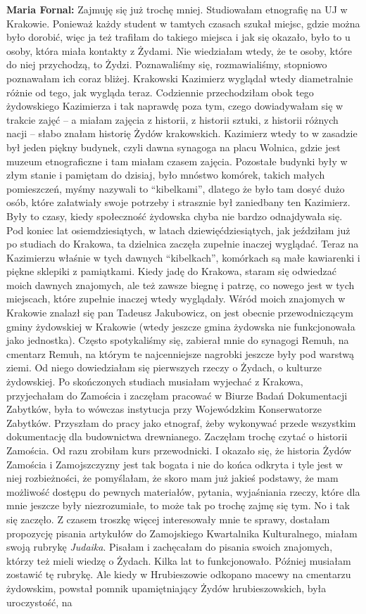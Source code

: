 \begin{otherlanguage}{polish}
\textbf{Maria Fornal:} Zajmuję się już trochę mniej. Studiowałam etnografię na UJ w Krakowie. Ponieważ każdy student w tamtych czasach szukał miejsc, gdzie można było dorobić, więc ja też trafiłam do takiego miejsca i jak się okazało, było to u osoby, która miała kontakty z Żydami. Nie wiedziałam wtedy, że te osoby, które do niej przychodzą, to Żydzi. Poznawaliśmy się, rozmawialiśmy, stopniowo poznawałam ich coraz bliżej. Krakowski Kazimierz wyglądał wtedy diametralnie różnie od tego, jak wygląda teraz. Codziennie przechodziłam obok tego żydowskiego Kazimierza i tak naprawdę poza tym, czego dowiadywałam się w trakcie zajęć – a miałam zajęcia z historii, z historii sztuki, z historii różnych nacji – słabo znałam historię Żydów krakowskich. Kazimierz wtedy to w zasadzie był jeden piękny budynek, czyli dawna synagoga na placu Wolnica, gdzie jest muzeum etnograficzne i tam miałam czasem zajęcia. Pozostałe budynki były w złym stanie i pamiętam do dzisiaj, było mnóstwo komórek, takich małych pomieszczeń, myśmy nazywali to "`kibelkami"', dlatego że było tam dosyć dużo osób, które załatwiały swoje potrzeby i strasznie był zaniedbany ten Kazimierz. Były to czasy, kiedy społeczność żydowska chyba nie bardzo odnajdywała się. Pod koniec lat osiemdziesiątych, w latach dziewięćdziesiątych, jak jeździłam już po studiach do Krakowa, ta dzielnica zaczęła zupełnie inaczej wyglądać. Teraz na Kazimierzu właśnie w tych dawnych "`kibelkach"', komórkach są małe kawiarenki i piękne sklepiki z pamiątkami. Kiedy jadę do Krakowa, staram się odwiedzać moich dawnych znajomych, ale też zawsze biegnę i patrzę, co nowego jest w tych miejscach, które zupełnie inaczej wtedy wyglądały. Wśród moich znajomych w Krakowie znalazł się pan Tadeusz Jakubowicz, on jest obecnie przewodniczącym gminy żydowskiej w Krakowie (wtedy jeszcze gmina żydowska nie funkcjonowała jako jednostka). Często spotykaliśmy się, zabierał mnie do synagogi Remuh, na cmentarz Remuh, na którym te najcenniejsze nagrobki jeszcze były pod warstwą ziemi. Od niego dowiedziałam się pierwszych rzeczy o Żydach, o kulturze żydowskiej. Po skończonych studiach musiałam wyjechać z Krakowa, przyjechałam do Zamościa i zaczęłam pracować w Biurze Badań Dokumentacji Zabytków, była to wówczas instytucja przy Wojewódzkim Konserwatorze Zabytków. Przyszłam do pracy jako etnograf, żeby wykonywać przede wszystkim dokumentację dla budownictwa drewnianego. Zaczęłam trochę czytać o historii Zamościa. Od razu zrobiłam kurs przewodnicki. I okazało się, że historia Żydów Zamościa i Zamojszczyzny jest tak bogata i nie do końca odkryta i tyle jest w niej rozbieżności, że pomyślałam, że skoro mam już jakieś podstawy, że mam możliwość dostępu do pewnych materiałów, pytania, wyjaśniania rzeczy, które dla mnie jeszcze były niezrozumiałe, to może tak po trochę zajmę się tym. No i tak się zaczęło. Z czasem troszkę więcej interesowały mnie te sprawy, dostałam propozycję pisania artykułów do Zamojskiego Kwartalnika Kulturalnego, miałam swoją rubrykę \textit{Judaika}. Pisałam i zachęcałam do pisania swoich znajomych, którzy też mieli wiedzę o Żydach. Kilka lat to funkcjonowało. Później musiałam zostawić tę rubrykę. Ale kiedy w Hrubieszowie odkopano macewy na cmentarzu żydowskim, powstał pomnik upamiętniający Żydów hrubieszowskich, była uroczystość, na 
\end{otherlanguage}
